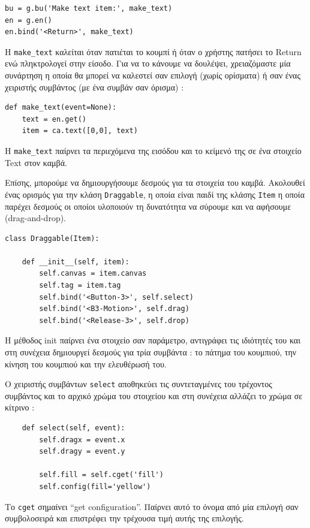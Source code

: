 \documentclass[10pt]{book}
\begin{document}
\begin{verbatim}
bu = g.bu('Make text item:', make_text)
en = g.en()
en.bind('<Return>', make_text)
\end{verbatim}
%
 Η  \verb"make_text"  καλείται όταν πατιέται το κουμπί ή όταν ο χρήστης πατήσει 
το  {\sf Return}  ενώ πληκτρολογεί στην είσοδο.  Για να το κάνουμε να δουλέψει, χρειαζόμαστε μία συνάρτηση η οποία θα μπορεί να καλεστεί σαν επιλογή (χωρίς ορίσματα) ή 
σαν ένας χειριστής συμβάντος (με ένα συμβάν σαν όρισμα) :

\begin{verbatim}
def make_text(event=None):
    text = en.get()
    item = ca.text([0,0], text)
\end{verbatim}
%
 Η  \verb"make_text"  παίρνει τα περιεχόμενα της εισόδου και το κείμενό της σε ένα 
στοιχείο  Text  στον καμβά.

Επίσης, μπορούμε να δημιουργήσουμε δεσμούς για τα στοιχεία του καμβά.  Ακολουθεί ένας 
ορισμός για την κλάση  {\tt Draggable},  η οποία είναι παιδί της κλάσης  {\tt Item} 
 η οποία παρέχει δεσμούς οι οποίοι υλοποιούν τη δυνατότητα να σύρουμε και να αφήσουμε  (drag-and-drop).

\begin{verbatim}
class Draggable(Item):

    def __init__(self, item):
        self.canvas = item.canvas
        self.tag = item.tag
        self.bind('<Button-3>', self.select)
        self.bind('<B3-Motion>', self.drag)
        self.bind('<Release-3>', self.drop)
\end{verbatim}
%
 Η μέθοδος  init  παίρνει ένα στοιχείο σαν παράμετρο, αντιγράφει τις ιδιότητές του και στη συνέχεια δημιουργεί δεσμούς για τρία συμβάντα :  το πάτημα του κουμπιού, την κίνηση του κουμπιού και την ελευθέρωσή του.

Ο χειριστής συμβάντων  {\tt select}  αποθηκεύει τις συντεταγμένες του τρέχοντος συμβάντος και το αρχικό χρώμα του στοιχείου και στη συνέχεια αλλάζει το χρώμα σε κίτρινο :

\begin{verbatim}
    def select(self, event):
        self.dragx = event.x
        self.dragy = event.y

        self.fill = self.cget('fill')
        self.config(fill='yellow')
\end{verbatim}
%
 Το  {\tt cget}  σημαίνει  ``get configuration''.   Παίρνει αυτό το όνομα από 
μία επιλογή σαν συμβολοσειρά και επιστρέφει την τρέχουσα τιμή αυτής της επιλογής.
\end{document}
